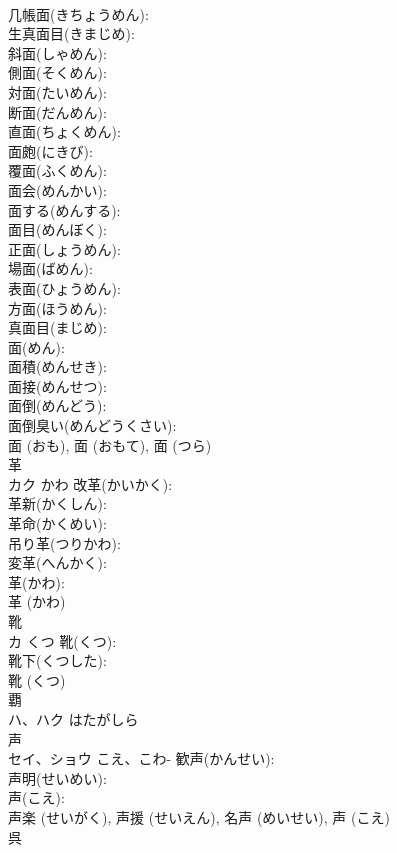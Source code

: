 \documentclass[8pt]{extreport}
\begin{document}
\begin{CJK}{UTF8}{min}
\\	几帳面(きちょうめん): 
\\	生真面目(きまじめ): 
\\	斜面(しゃめん): 
\\	側面(そくめん): 
\\	対面(たいめん): 
\\	断面(だんめん): 
\\	直面(ちょくめん): 
\\	面皰(にきび): 
\\	覆面(ふくめん): 
\\	面会(めんかい): 
\\	面する(めんする): 
\\	面目(めんぼく): 
\\	正面(しょうめん): 
\\	場面(ばめん): 
\\	表面(ひょうめん): 
\\	方面(ほうめん): 
\\	真面目(まじめ): 
\\	面(めん): 
\\	面積(めんせき): 
\\	面接(めんせつ): 
\\	面倒(めんどう): 
\\	面倒臭い(めんどうくさい): 
\\	面 (おも), 面 (おもて), 面 (つら)
\\	革			
\\	カク	かわ	改革(かいかく): 
\\	革新(かくしん): 
\\	革命(かくめい): 
\\	吊り革(つりかわ): 
\\	変革(へんかく): 
\\	革(かわ): 
\\	革 (かわ)
\\	靴			
\\	カ	くつ	靴(くつ): 
\\	靴下(くつした): 
\\	靴 (くつ)
\\	覇			
\\	ハ、ハク	はたがしら		
\\	声			
\\	セイ、ショウ	こえ、こわ-	歓声(かんせい): 
\\	声明(せいめい): 
\\	声(こえ): 
\\	声楽 (せいがく), 声援 (せいえん), 名声 (めいせい), 声 (こえ)
\\	呉			

\end{CJK}
\end{document}
